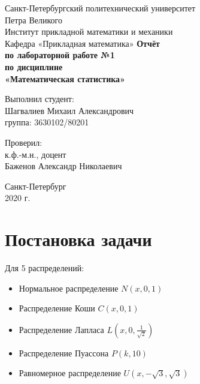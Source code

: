 \documentclass[12pt,a4paper]{article}
\begin{document}
	
\begin{titlepage}
	\begin{center}		
		\vfill	
		Санкт-Петербургский политехнический университет \\
		Петра Великого\\
		\vskip 1cm
		Институт прикладной математики и механики \\
		Кафедра «Прикладная математика»
		\vfill
		\textbf{Отчёт\\
			по лабораторной работе №1\\
			по дисциплине\\
			«Математическая статистика»\\}
		\vfill
	\end{center}
	\vfill
	\hfill
	\begin{minipage}{0.4\textwidth}
		Выполнил студент:\\
		Шагвалиев Михаил Александрович\\
		группа: 3630102/80201\\
	\end{minipage}
	\vfill
	\hfill 
	\begin{minipage}{0.4\textwidth}
		Проверил:\\
		к.ф.-м.н., доцент\\
		Баженов Александр Николаевич\
	\end{minipage}
	\vfill
	\begin{center}
		Санкт-Петербург\\2020 г.
	\end{center}
\end{titlepage}

\tableofcontents
\pagebreak
\listoffigures
\pagebreak

\section{Постановка задачи}
Для 5 распределений:

\begin{itemize}
	\item Нормальное распределение $N(x, 0, 1)$
	\item Распределение Коши $C(x, 0, 1)$
	\item Распределение Лапласа $L(x, 0, \frac{1}{\sqrt{2}})$
	\item Распределение Пуассона $P(k, 10)$
	\item Равномерное распределение $U(x, -\sqrt{3}, \sqrt{3})$	
\end{itemize}
\end{document}
